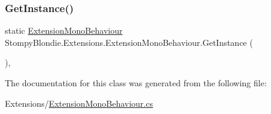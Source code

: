 \subsubsection{\texorpdfstring{Get\+Instance()}{GetInstance()}}
{\footnotesize\ttfamily static \mbox{\hyperlink{class_stompy_blondie_1_1_extensions_1_1_extension_mono_behaviour}{Extension\+Mono\+Behaviour}} Stompy\+Blondie.\+Extensions.\+Extension\+Mono\+Behaviour.\+Get\+Instance (\begin{DoxyParamCaption}{ }\end{DoxyParamCaption})\hspace{0.3cm}{\ttfamily [inline]}, {\ttfamily [static]}}



The documentation for this class was generated from the following file\+:\begin{DoxyCompactItemize}
\item 
Extensions/\mbox{\hyperlink{_extension_mono_behaviour_8cs}{Extension\+Mono\+Behaviour.\+cs}}\end{DoxyCompactItemize}
